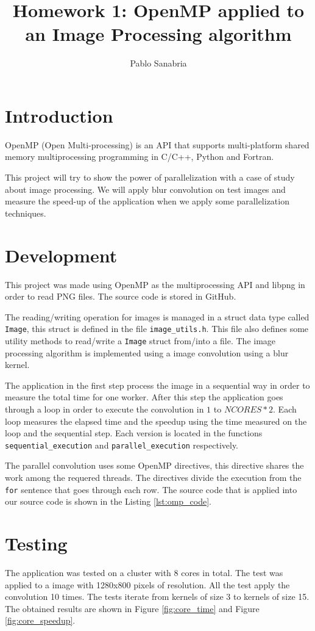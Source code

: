 \documentclass{article}
\title{Homework 1: OpenMP applied to an Image Processing algorithm}
\author{Pablo Sanabria}
\date{}
\begin{document}
	\maketitle
	\section{Introduction}
	OpenMP (Open Multi-processing)  is an API that supports multi-platform shared memory multiprocessing programming in C/C++, Python and Fortran.
	
	This project will try to show the power of parallelization with a case of study about image processing. We will apply blur convolution on test images and measure the speed-up of the application when we apply some parallelization techniques.
	
	\section{Development}
	This project was made using OpenMP as the multiprocessing API and libpng in order to read PNG files. The source code is stored in GitHub.
	
	The reading/writing operation for images is managed in a struct data type called \texttt{Image}, this struct is defined in the file \texttt{image\_utils.h}. This file also defines some utility methods to read/write a \texttt{Image} struct from/into a file. The image processing algorithm is implemented using a image convolution using a blur kernel.
	
	The application in the first step process the image in a sequential way in order to measure the total time for one worker. After this step the application goes through a loop in order to execute the convolution in $1$ to $ NCORES * 2 $. Each loop measures the elapsed time and the speedup using the time measured on the loop and the sequential step. Each version is located in the functions \texttt{sequential\_execution} and \texttt{parallel\_execution} respectively.
	
	The parallel convolution uses some OpenMP directives, this directive shares the work among the requered threads. The directives divide the execution from the \texttt{for} sentence that goes through each row. The source code that is applied into our source code is shown in the Listing \ref{lst:omp_code}.
	
	\section{Testing}
	The application was tested on a cluster with 8 cores in total. The test was applied to a image with 1280x800 pixels of resolution. All the test apply the convolution 10 times. The tests iterate from kernels of size 3 to kernels of size 15. The obtained results are shown in Figure \ref{fig:core_time} and Figure \ref{fig:core_speedup}.
	
\end{document}
